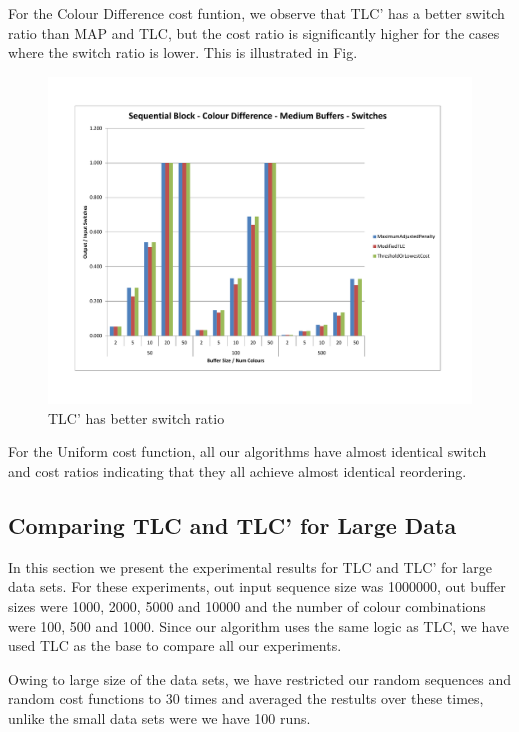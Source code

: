 For the Colour Difference cost funtion, we observe that TLC' has a better switch ratio than MAP and TLC, but the cost ratio is significantly higher for the cases where the switch ratio is lower. This is illustrated in Fig. 

\begin{figure}[ht]
\centering 
\includegraphics[scale=0.60]{Sequential-Block-cd-medium-switches.pdf}
\caption{TLC' has better switch ratio}
\label{sequentialBlockCDMediumSwitches}
\end{figure}   

For the Uniform cost function, all our algorithms have almost identical switch and cost ratios indicating that they all achieve almost identical reordering. 

\subsection{Comparing TLC and TLC' for Large Data}

In this section we present the experimental results for TLC and TLC' for large data sets. For these experiments, out input sequence size was 1000000, out buffer sizes were 1000, 2000, 5000 and 10000 and the number of colour combinations were 100, 500 and 1000. Since our algorithm uses the same logic as TLC, we have used TLC as the base to compare all our experiments. 

Owing to large size of the data sets, we have restricted our random sequences and random cost functions to 30 times and averaged the restults over these times, unlike the small data sets were we have 100 runs. 

